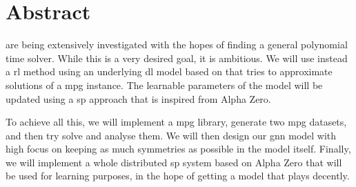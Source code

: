 \chapter*{Abstract}
 are being extensively investigated with the hopes of finding a general polynomial time solver. While this is a very desired goal, it is ambitious. We will use instead a \acrfull{rl} method using an underlying \acrfull{dl} model based on  that tries to approximate solutions of a \acrshort{mpg} instance. The learnable parameters of the model will be updated using a \acrfull{sp} approach that is inspired from Alpha Zero.

To achieve all this, we will implement a \acrshort{mpg} library, generate two \acrshort{mpg} datasets, and then try solve and analyse them.  We will then design our \acrshort{gnn} model with high focus on keeping as much symmetries as possible in the model itself. Finally, we will implement a whole distributed \acrshort{sp} system based on Alpha Zero that will be used for learning purposes, in the hope of getting a model that plays decently. 